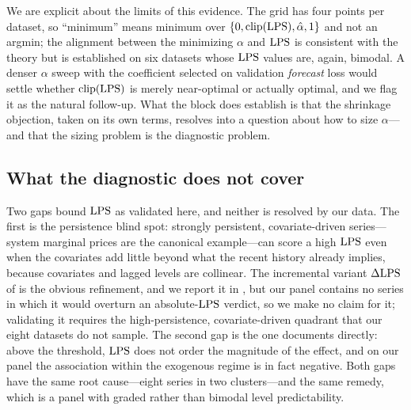 We are explicit about the limits of this evidence. The grid has four points per dataset, so ``minimum'' means minimum over $\{0, \mathrm{clip}(\mathrm{LPS}), \hat\alpha, 1\}$ and not an argmin; the alignment between the minimizing $\alpha$ and $\mathrm{LPS}$ is consistent with the theory but is established on six datasets whose $\mathrm{LPS}$ values are, again, bimodal. A denser $\alpha$ sweep with the coefficient selected on validation \emph{forecast} loss would settle whether $\mathrm{clip}(\mathrm{LPS})$ is merely near-optimal or actually optimal, and we flag it as the natural follow-up. What the block does establish is that the shrinkage objection, taken on its own terms, resolves into a question about how to size $\alpha$---and that the sizing problem is the diagnostic problem.

\subsection{What the diagnostic does not cover}

Two gaps bound $\mathrm{LPS}$ as validated here, and neither is resolved by our data. The first is the persistence blind spot: strongly persistent, covariate-driven series---system marginal prices are the canonical example---can score a high $\mathrm{LPS}$ even when the covariates add little beyond what the recent history already implies, because covariates and lagged levels are collinear. The incremental variant $\Delta\mathrm{LPS}$ of  is the obvious refinement, and we report it in , but our panel contains no series in which it would overturn an absolute-$\mathrm{LPS}$ verdict, so we make no claim for it; validating it requires the high-persistence, covariate-driven quadrant that our eight datasets do not sample. The second gap is the one  documents directly: above the threshold, $\mathrm{LPS}$ does not order the magnitude of the effect, and on our panel the association within the exogenous regime is in fact negative. Both gaps have the same root cause---eight series in two clusters---and the same remedy, which is a panel with graded rather than bimodal level predictability.

